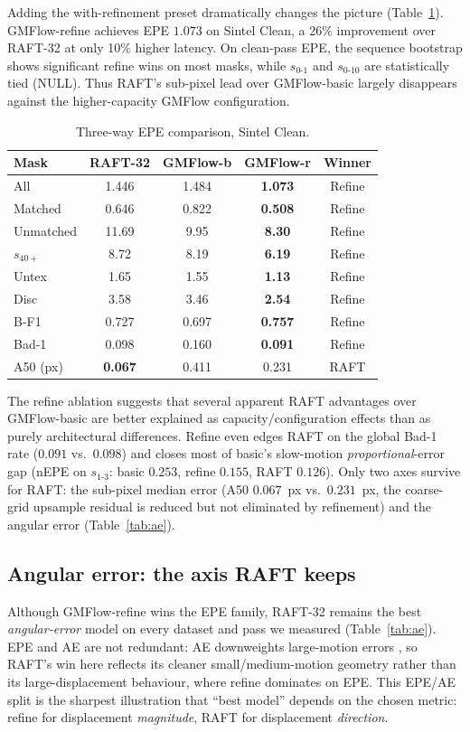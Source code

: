 \documentclass[11pt,a4paper]{article}
\begin{document}
Adding the with-refinement preset dramatically changes the picture
(Table~\ref{tab:refine}).  GMFlow-refine achieves EPE $1.073$ on
Sintel Clean, a 26\% improvement over RAFT-32 at only 10\% higher
latency.  On clean-pass EPE, the sequence bootstrap shows significant
refine wins on most masks, while $s_{0\text{-}1}$ and
$s_{0\text{-}10}$ are statistically tied (NULL).  Thus RAFT's sub-pixel
lead over GMFlow-basic largely disappears against the higher-capacity
GMFlow configuration.

\begin{table}[htbp]
\centering
\caption{Three-way EPE comparison, Sintel Clean.}
\label{tab:refine}
\small
\setlength{\tabcolsep}{5pt}
\begin{tabular}{lcccc}
\toprule
Mask & RAFT-32 & GMFlow-b & GMFlow-r & Winner \\
\midrule
All       & 1.446 & 1.484 & \textbf{1.073} & Refine \\
Matched   & 0.646 & 0.822 & \textbf{0.508} & Refine \\
Unmatched & 11.69 & 9.95  & \textbf{8.30}  & Refine \\
$s_{40+}$ & 8.72  & 8.19  & \textbf{6.19}  & Refine \\
Untex     & 1.65  & 1.55  & \textbf{1.13}  & Refine \\
Disc      & 3.58  & 3.46  & \textbf{2.54}  & Refine \\
B-F1      & 0.727 & 0.697 & \textbf{0.757} & Refine \\
Bad-1     & 0.098 & 0.160 & \textbf{0.091} & Refine \\
A50 (px)  & \textbf{0.067} & 0.411 & 0.231 & RAFT \\
\bottomrule
\end{tabular}
\end{table}

The refine ablation suggests that several apparent RAFT advantages over
GMFlow-basic are better explained as capacity/configuration effects than
as purely architectural differences.  Refine even edges RAFT on the
global Bad-1 rate ($0.091$ vs.\ $0.098$) and closes most of basic's
slow-motion \emph{proportional}-error gap (nEPE on $s_{1\text{-}3}$:
basic $0.253$, refine $0.155$, RAFT $0.126$).  Only two axes survive for
RAFT: the sub-pixel median error (A50 $0.067$~px vs.\ $0.231$~px, the
coarse-grid upsample residual is reduced but not eliminated by
refinement) and the angular error (Table~\ref{tab:ae}).

\subsection{Angular error: the axis RAFT keeps}
Although GMFlow-refine wins the EPE family, RAFT-32 remains the best
\emph{angular-error} model on every dataset and pass we measured
(Table~\ref{tab:ae}).  EPE and AE are not redundant: AE downweights
large-motion errors \cite{baker2011}, so RAFT's win here reflects its
cleaner small/medium-motion geometry rather than its large-displacement
behaviour, where refine dominates on EPE.  This EPE/AE split is the
sharpest illustration that ``best model'' depends on the chosen metric:
refine for displacement \emph{magnitude}, RAFT for displacement
\emph{direction}.
\end{document}
